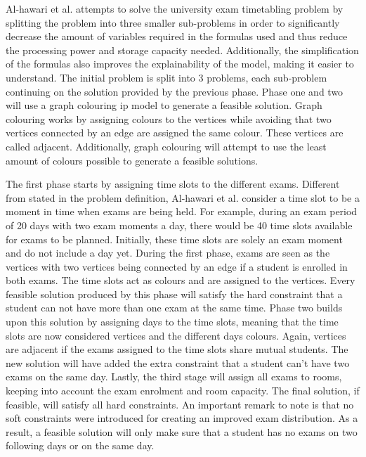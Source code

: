 Al-hawari et al. \cite{hawari2017} attempts to solve the university exam timetabling problem by splitting the problem into three smaller sub-problems in order to significantly decrease the amount of variables required in the formulas used and thus reduce the processing power and storage capacity needed. Additionally, the simplification of the formulas also improves the explainability of the model, making it easier to understand. The initial problem is split into 3 problems, each sub-problem continuing on the solution provided by the previous phase. Phase one and two will use a  graph colouring \acrfull{ip} model to generate a feasible solution. Graph colouring works by assigning colours to the vertices while avoiding that two vertices connected by an edge are assigned the same colour. These vertices are called adjacent. Additionally, graph colouring will attempt to use the least amount of colours possible to generate a feasible solutions.

The first phase starts by assigning time slots to the different exams. Different from stated in the problem definition, Al-hawari et al. consider a time slot to be a moment in time when exams are being held. For example, during an exam period of 20 days with two exam moments a day, there would be 40 time slots available for exams to be planned. Initially, these time slots are solely an exam moment and do not include a day yet. During the first phase, exams are seen as the vertices with two vertices being connected by an edge if a student is enrolled in both exams. The time slots act as colours and are assigned to the vertices. Every feasible solution produced by this phase will satisfy the hard constraint that a student can not have more than one exam at the same time. Phase two builds upon this solution by assigning days to the time slots, meaning that the time slots are now considered vertices and the different days colours. Again, vertices are adjacent if the exams assigned to the time slots share mutual students. The new solution will have added the extra constraint that a student can't have two exams on the same day. Lastly, the third stage will assign all exams to rooms, keeping into account the exam enrolment and room capacity. The final solution, if feasible, will satisfy all hard constraints. An important remark to note is that no soft constraints were introduced for creating an improved exam distribution. As a result, a feasible solution will only make sure that a student has no exams on two following days or on the same day.


